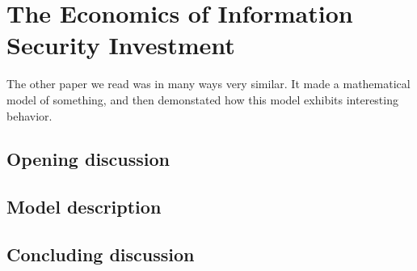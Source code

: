 \documentclass[11pt]{article}
\begin{document}
\section{The Economics of Information Security Investment}

The other paper we read was in many ways very similar. It made a mathematical model of something, and then demonstated how this model exhibits interesting behavior.

\subsection{Opening discussion}

\subsection{Model description}

\subsection{Concluding discussion}
\end{document}
